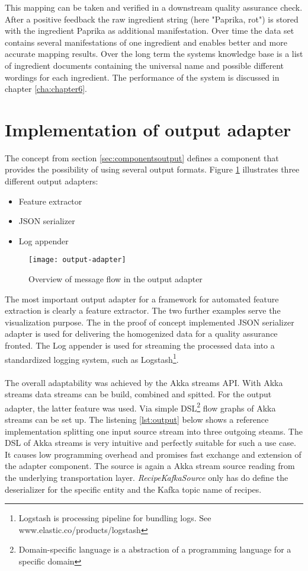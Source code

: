 This mapping can be taken and verified in a downstream quality assurance check. After a positive feedback the raw ingredient string (here "Paprika, rot") is stored with the ingredient Paprika as additional manifestation. Over time the data set contains several manifestations of one ingredient and enables better and more accurate mapping results. Over the long term the systems knowledge base is a list of ingredient documents containing the universal name and possible different wordings for each ingredient. The performance of the system is discussed in chapter \ref{cha:chapter6}.

\section{Implementation of output adapter}

The concept from section \ref{sec:componentsoutput} defines a component that provides the possibility of using several output formats. Figure \ref{fig:output-adapter} illustrates three different output adapters:
\begin{itemize}
\item Feature extractor
\item JSON serializer
\item Log appender
\end{itemize}

\begin{figure}[htb]
  \centering
  \texttt{[image: output-adapter]}\\
  \caption{Overview of message flow in the output adapter}
  \label{fig:output-adapter}
\end{figure}

The most important output adapter for a framework for automated feature extraction is clearly a feature extractor. The two further examples serve the visualization purpose. The in the proof of concept implemented JSON serializer adapter is used for delivering the homogenized data for a quality assurance fronted. The Log appender is used for streaming the processed data into a standardized logging system, such as Logstash\footnote{Logstash is processing pipeline for bundling logs. See www.elastic.co/products/logstash}. 
\\\\
The overall adaptability was achieved by the Akka streams API. With Akka streams data streams can be build, combined and spitted. For the output adapter, the latter feature was used. Via simple DSL\footnote{Domain-specific language is a abstraction of a programming language for a specific domain} flow graphs of Akka streams can be set up. The listening \ref{lst:output} below shows a reference implementation splitting one input source stream into three outgoing steams. The DSL of Akka streams is very intuitive and perfectly suitable for such a use case. It causes low programming overhead and promises fast exchange and extension of the adapter component. The source is again a Akka stream source reading from the underlying transportation layer. \textit{RecipeKafkaSource} only has do define the deserializer for the specific entity and the Kafka topic name of recipes.

